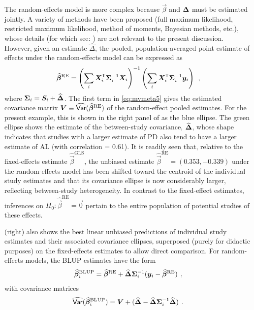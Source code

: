 The random-effects model is more complex because $\vec{\beta}$ and $\bm{\Delta}$ must be estimated jointly.
A variety of methods have been proposed (full maximum likelihood, restricted maximum likelihood, method of
moments, Bayesian methods, etc.), whose details (for which see: \citet{Jackson-etal:2011}) are not relevant to the present discussion. 
However, given an estimate $\widehat{\Delta}$, the pooled, population-averaged point estimate of effects under the
random-effects model can be expressed as
\begin{equation} \label{eq:mvmeta5}
\widehat{\bm{\beta}}^{\textrm{RE}} = \left(\sum_i \bm{X}_i^\mathsf{T}  \bm{\Sigma}_i^{-1} \bm{X}_i  \right)^{-1}
                                      \left(\sum_i \bm{X}_i^\mathsf{T}  \bm{\Sigma}_i^{-1} \bm{y}_i \right) \:\: ,
\end{equation}
where $\bm{\Sigma}_i = \bm{S}_i + \widehat{\bm{\Delta}}$.
The first term in \eqref{eq:mvmeta5} gives the estimated covariance matrix $\bm{V} \equiv \widehat{\mathsf{Var}}(\widehat{\bm{\beta}}^{\textrm{RE}})$
of the random-effect pooled estimates.
For the present example, this is shown in the right panel of  as the blue ellipse.  The green ellipse shows the
estimate of the between-study covariance, $\widehat{\bm{\Delta}}$, whose shape indicates that studies with a larger estimate
of PD also tend to have a larger estimate of AL (with correlation = 0.61).
It is readily seen that, relative to
the fixed-effects estimate $\widehat{\vec{\beta}}^{\textrm{GLS}}$,
the unbiased estimate $\widehat{\vec{\beta}}^{\textrm{RE}} = (0.353, -0.339)$
under the random-effects model  
has been shifted toward the centroid of the individual study estimates
and that its covariance ellipse is now considerably larger, reflecting between-study heterogeneity.
In contrast to the fixed-effect estimates, inferences on $H_0 : \widehat{\vec{\beta}}^{\textrm{RE}} = \vec{0}$
pertain to the entire population of potential studies of these effects.

(right) also shows the best linear unbiased predictions of individual study estimates
and their associated covariance ellipses, superposed (purely for didactic purposes)
on the fixed-effects estimates to allow direct comparison.
For random-effects models, the BLUP estimates have the form
\begin{equation} \label{eq:mvmeta6}
\widehat{\bm{\beta}}_i^{\textrm{BLUP}} = \widehat{\bm{\beta}}^{\textrm{RE}} + \widehat{\bm{\Delta}}  \bm{\Sigma}_i^{-1} (\bm{y}_i - \widehat{\bm{\beta}}^{\textrm{RE}}) \:\: ,
\end{equation}
with covariance matrices
\begin{equation} \label{eq:mvmeta7}
\widehat{\mathsf{Var}}(\widehat{\bm{\beta}}_i^{\textrm{BLUP}}) = \bm{V} + (\widehat{\bm{\Delta}} - \widehat{\bm{\Delta}}  \bm{\Sigma}_i^{-1} \widehat{\bm{\Delta}})
\:\: .
\end{equation}


